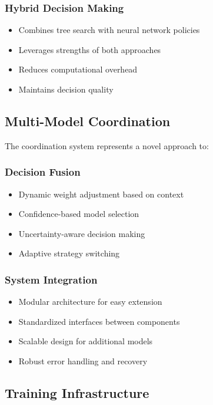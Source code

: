\documentclass[conference]{IEEEtran}
\begin{document}
\subsubsection{Hybrid Decision Making}
\begin{itemize}
    \item Combines tree search with neural network policies
    \item Leverages strengths of both approaches
    \item Reduces computational overhead
    \item Maintains decision quality
\end{itemize}

\subsection{Multi-Model Coordination}

The coordination system represents a novel approach to:

\subsubsection{Decision Fusion}
\begin{itemize}
    \item Dynamic weight adjustment based on context
    \item Confidence-based model selection
    \item Uncertainty-aware decision making
    \item Adaptive strategy switching
\end{itemize}

\subsubsection{System Integration}
\begin{itemize}
    \item Modular architecture for easy extension
    \item Standardized interfaces between components
    \item Scalable design for additional models
    \item Robust error handling and recovery
\end{itemize}

\subsection{Training Infrastructure}
\end{document}
